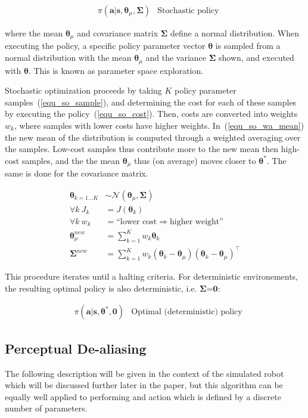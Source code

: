 \documentclass[12pt]{article}
\newcommand{\mymath}[1]{\ensuremath{#1}\xspace}
\newcommand{\act}    {\mymath{\mathbf{a}}}
\newcommand{\sta}    {\mymath{\mathbf{s}}}
\newcommand{\app}    {\mymath{\bm{\theta}}}
\newcommand{\covar}  {\mymath{\bm{\Sigma}}}
\begin{document}
\begin{align}
& \pi(\act|\sta,\app_\mu,\covar) & \mbox{Stochastic policy} \label{eq:stoch}
\end{align}

where the mean $\app_\mu$ and covariance matrix \covar  define a normal distribution. When executing the policy, a specific policy parameter vector \app is sampled from a normal distribution with the mean $\app_\mu$ and the variance $\covar$ shown, and executed with \app. This is known as parameter space exploration. 

Stochastic optimization proceeds by taking $K$ policy parameter samples~(\ref{equ_so_sample}), and determining the cost for each of these samples by executing the policy~(\ref{equ_so_cost}). Then, costs are converted into weights $w_k$, where samples with lower costs have higher weights. In~(\ref{equ_so_wa_mean}) the new mean of the distribution is computed through a weighted averaging over the samples. Low-cost samples thus contribute more to the new mean then high-cost samples, and the the mean $\app_\mu$ thus (on average) moves closer to $\app^*$. The same is done for the covariance matrix.

\begin{align}
\app_{k=1\dots K} & {\sim}\mathcal{N}({\app_\mu},{\covar})\label{equ_so_sample}\\
\forall k~J_k & = J(\app_k) \label{equ_so_cost}\\
\forall k~w_k & = \mbox{``lower cost} \Rightarrow \mbox{higher weight''}\label{equ_so_cost_to_w}\\
\app_\mu^{new} & = \sum_{k=1}^{K} w_k \app_k\label{equ_so_wa_mean}\\
\covar^{new} & = \sum_{k=1}^{K}w_k(\app_k-\app_\mu)(\app_k-\app_\mu)^\intercal\label{equ_so_wa_covar}
\end{align}

This procedure iterates until a halting criteria. For deterministic environements, the resulting optimal policy is also deterministic, i.e. \covar=$\mathbf{0}$:

\begin{align}
& \pi(\act|\sta,\app^*,\mathbf{0}) & \mbox{Optimal (deterministic) policy} \label{eq:stoch_opt}
\end{align}

\subsection{Perceptual De-aliasing}
The following description will be given in the context of the simulated robot which will be discussed further later in the paper, but this algorithm can be equally well applied to performing and action which is defined by a discrete number of parameters. 
\end{document}
